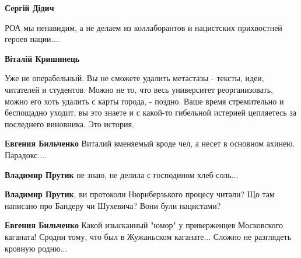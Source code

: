 \begin{itemize}
\begin{itemize}
\textbf{Сергій Дідич} 

РОА мы ненавидим, а не делаем из коллаборантов и нацистских прихвостней героев
нации....


 
\textbf{Віталій Кришинець} 

Уже не операбельный. Вы не сможете удалить метастазы - тексты, идеи, читателей
и студентов. Можно не то, что весь университет реорганизовать, можно его хоть
удалить с карты города, - поздно. Ваше время стремительно и беспощадно уходит,
вы это знаете и с какой-то гибельной истерией цепляетесь за последнего
виновника. Это история.

 
\textbf{Евгения Бильченко} Виталий вменяемый вроде чел, а несет в основном ахинею. Парадокс....

 
\textbf{Владимир Прутик} не знаю, не делила с господином хлеб-соль...

 
\textbf{Владимир Прутик}, ви протоколи Нюрнберзького процесу читали? Що там написано про Бандеру чи Шухевича? Вони були нацистами?

 
\textbf{Евгения Бильченко} Какой изысканный "юмор" у приверженцев Московского каганата! Сродни тому, что был в Жужаньском каганате... Сложно не разглядеть кровную родню...


\end{itemize}
\end{itemize}
